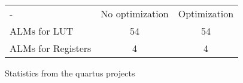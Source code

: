 \begin{figure}
	\centering
	\begin{tabular}{ l c c }
		-                 & No optimization & Optimization \\
		ALMs for LUT      & 54              & 54           \\
		ALMs for Registers& 4               & 4            \\
	\end{tabular}
	\caption{Statistics from the quartus projects}
	\label{table:vhdl_improvements_quartus}
\end{figure}